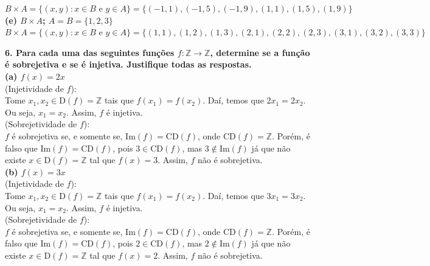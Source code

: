 \documentclass[12pt, a4paper]{article}
\begin{document}
\(B \times A = \{(x,y): x \in B \text{ e } y \in A\} = \{(-1, 1),(-1,5),(-1,9),(1,1), (1, 5), (1,9)\}\) \\

\textbf{(e) \(B \times A\); \(A = B = \{1,2,3\}\)} \\

\(B \times A = \{(x,y): x \in B \text{ e } y \in A\} = \{(1, 1),(1,2),(1,3),(2,1), (2, 2), (2,3), (3,1),(3,2),(3,3)\}\) \\
\newpage

\textbf{6. Para cada uma das seguintes funções \(f: \mathbb{Z} \to \mathbb{Z}\), determine se a função é sobrejetiva e se é injetiva. Justifique todas as respostas.} \\

\textbf{(a) \(f(x) = 2x\)} \\

(Injetividade de \(f\)): \\
Tome \(x_1, x_2 \in \mathrm{D}(f)=\mathbb{Z}\) tais que \(f(x_1) = f(x_2)\). Daí, temos que \(2x_1 = 2x_2\). Ou seja, \(x_1 = x_2\). Assim, \(f\) é injetiva. \\

(Sobrejetividade de \(f\)): \\
\(f\) é sobrejetiva se, e somente se, \(\mathrm{Im}(f) = \mathrm{CD}(f)\), onde \(\mathrm{CD}(f) = \mathbb{Z}\). Porém, é falso que \(\mathrm{Im}(f) = \mathrm{CD}(f)\), pois \(3 \in \mathrm{CD}(f)\), mas \(3 \notin \mathrm{Im}(f)\) já que não existe \(x \in \mathrm{D}(f)= \mathbb{Z}\) tal que \(f(x) = 3\). Assim, \(f\) não é sobrejetiva. \\


\textbf{(b) \(f(x) = 3x\)} \\

(Injetividade de \(f\)): \\
Tome \(x_1, x_2 \in \mathrm{D}(f)=\mathbb{Z}\) tais que \(f(x_1) = f(x_2)\). Daí, temos que \(3x_1 = 3x_2\). Ou seja, \(x_1 = x_2\). Assim, \(f\) é injetiva. \\

(Sobrejetividade de \(f\)): \\
\(f\) é sobrejetiva se, e somente se, \(\mathrm{Im}(f) = \mathrm{CD}(f)\), onde \(\mathrm{CD}(f) = \mathbb{Z}\). Porém, é falso que \(\mathrm{Im}(f) = \mathrm{CD}(f)\), pois \(2 \in \mathrm{CD}(f)\), mas \(2 \notin \mathrm{Im}(f)\) já que não existe \(x \in \mathrm{D}(f)= \mathbb{Z}\) tal que \(f(x) = 2\). Assim, \(f\) não é sobrejetiva. \\
\end{document}
